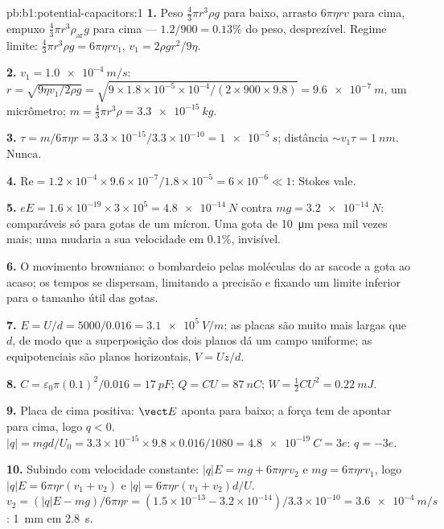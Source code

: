 \begin{solution}{pb:b1:potential-capacitors:1}
\textbf{1.} Peso $\tfrac43\pi r^3\rho g$ para baixo, arrasto $6\pi\eta rv$ para cima,
empuxo $\tfrac43\pi r^3\rho_{\text{ar}}g$ para cima --- $1.2/900 = 0.13\%$ do
peso, desprezível. Regime limite: $\tfrac43\pi r^3\rho g = 6\pi\eta rv_1$, $v_1 =
2\rho gr^2/9\eta$.

\textbf{2.} $v_1 = \qty{1.0e-4}{m/s}$: $r = \sqrt{9\eta v_1/2\rho g} = \sqrt{9 \times
1.8 \times 10^{-5} \times 10^{-4}/(2 \times 900 \times 9.8)} = \qty{9.6e-7}{m}$, um
micrômetro; $m = \tfrac43\pi r^3\rho = \qty{3.3e-15}{kg}$.

\textbf{3.} $\tau = m/6\pi\eta r = 3.3 \times 10^{-15}/3.3 \times 10^{-10} = \qty{1e-5}{s}$;
distância $\sim v_1\tau = \qty{1}{nm}$. Nunca.

\textbf{4.} $\mathrm{Re} = 1.2 \times 10^{-4} \times 9.6 \times 10^{-7}/1.8 \times 10^{-5} =
6 \times 10^{-6} \ll 1$: Stokes vale.

\textbf{5.} $eE = 1.6 \times 10^{-19} \times 3 \times 10^5 = \qty{4.8e-14}{N}$ contra
$mg = \qty{3.2e-14}{N}$: comparáveis só para gotas de um mícron. Uma gota de \qty{10}{\micro m}
pesa mil vezes mais; uma  mudaria
a sua velocidade em $0.1\%$, invisível.

\textbf{6.} O movimento browniano: o bombardeio pelas moléculas do ar sacode
a gota ao acaso; os tempos se dispersam, limitando a precisão e
fixando um limite inferior para o tamanho útil das gotas.

\textbf{7.} $E = U/d = 5000/0.016 = \qty{3.1e5}{V/m}$; as placas são muito mais largas que
$d$, de modo que a superposição dos dois planos dá um campo uniforme; as
equipotenciais são planos horizontais, $V = Uz/d$.

\textbf{8.} $C = \varepsilon_0\pi(0.1)^2/0.016 = \qty{17}{pF}$; $Q = CU = \qty{87}{nC}$;
$W = \tfrac12CU^2 = \qty{0.22}{mJ}$.

\textbf{9.} Placa de cima positiva: $\vect E$ aponta para baixo; a força tem de
apontar para cima, logo $q < 0$. $|q| = mgd/U_0 = 3.3 \times 10^{-15} \times 9.8 \times 0.016/
1080 = \qty{4.8e-19}{C} = 3e$: $q = -3e$.

\textbf{10.} Subindo com velocidade constante: $|q|E = mg + 6\pi\eta rv_2$ e $mg =
6\pi\eta rv_1$, logo $|q|E = 6\pi\eta r(v_1 + v_2)$ e $|q| = 6\pi\eta r(v_1 +
v_2)d/U$. $v_2 = (|q|E - mg)/6\pi\eta r = (1.5 \times 10^{-13} - 3.2 \times 10^{-14})/
3.3 \times 10^{-10} = \qty{3.6e-4}{m/s}$: \qty{1}{mm} em \qty{2.8}{s}.


\end{solution}

